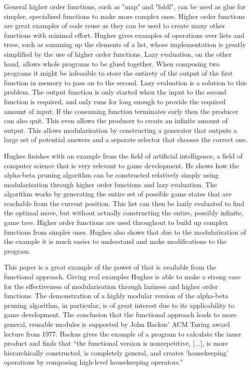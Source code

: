 General higher order functions, such as "map" and "foldl", can be used as glue for
simpler, specialised functions to make more complex ones. Higher order functions
are great examples of code reuse as they can be used to create many other functions
with minimal effort. Hughes gives examples of operations over lists and trees, such
as summing up the elements of a list, whose implementation is greatly simplified
by the use of higher order functions. Lazy evaluation, on the other hand, allows
whole programs to be glued together. When composing two programs it might be
infeasible to store the entirety of the output of the first function in memory to
pass on to the second. Lazy evaluation is a solution to this problem. The output
function is only started when the input to the second function is required, and
only runs for long enough to provide the required amount of input. If the consuming
function terminates early then the producer can also quit. This even allows the
producer to create an infinite amount of output. This allows modularisation by
constructing a generator that outputs a large set of potential answers and a
separate selector that chooses the correct one.

Hughes finishes with an example from the field of artificial intelligence, a
field of computer science that is very relevant to game development. He shows
how the alpha-beta pruning algorithm can be constructed relatively simply using
modularisation through higher order functions and lazy evaluation. The algorithm
works by generating the entire set of possible game states that are reachable
from the current position. This list can then be lazily evaluated to find the
optimal move, but without actually constructing the entire, possibly infinite,
game tree. Higher order functions are used throughout to build up complex
functions from simpler ones. Hughes also shows that due to the modularisation
of the example it is much easier to understand and make modifications to the
program.

This paper is a great example of the power of that is available from the functional
approach. Giving real examples Hughes is able to make a strong case for the
effectiveness of modularisation through laziness and higher order functions.
The demonstration of a highly modular version of the alpha-beta pruning algorithm,
in particular, is of great interest due to its applicability to game development.
The conclusion that the functional approach leads to more general, reusable
modules is supported by John Backus' ACM Turing award lecture from 1977. Backus
gives the example of a program to calculate the inner product and finds that
``the functional version is nonrepetitive, [...], is more hierarchically constructed,
is completely general, and creates `housekeeping' operations by composing high-level
housekeeping operators.''\cite{backus1978liberate}

